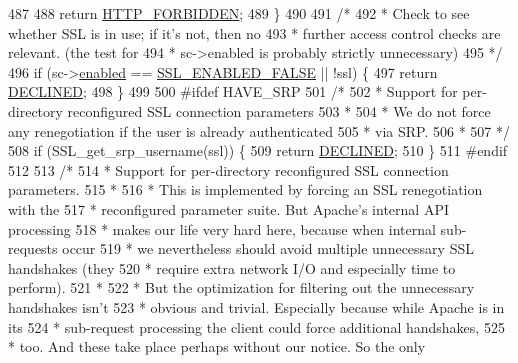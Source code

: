 \begin{DoxyCode}
{487 
488         \textcolor{keywordflow}{return} \hyperlink{group__HTTP__Status_ga92646f876056a1e5013e0050496dc04d}{HTTP\_FORBIDDEN};
489     \}
490 
491     \textcolor{comment}{/*}
492 \textcolor{comment}{     * Check to see whether SSL is in use; if it's not, then no}
493 \textcolor{comment}{     * further access control checks are relevant.  (the test for}
494 \textcolor{comment}{     * sc->enabled is probably strictly unnecessary)}
495 \textcolor{comment}{     */}
496     \textcolor{keywordflow}{if} (sc->\hyperlink{structSSLSrvConfigRec_a79b2e4b68e2efe964c8a0d1e715830f3}{enabled} == \hyperlink{group__MOD__SSL__PRIVATE_gga2a6d65d4ff2b1083702c82c09325c299a68431c402a1002c08844d80b2c5a66b9}{SSL\_ENABLED\_FALSE} || !ssl) \{
497         \textcolor{keywordflow}{return} \hyperlink{group__APACHE__CORE__DAEMON_ga9eba11ca86461a3ae319311d64682dda}{DECLINED};
498     \}
499 
500 \textcolor{preprocessor}{#ifdef HAVE\_SRP}
501     \textcolor{comment}{/*}
502 \textcolor{comment}{     * Support for per-directory reconfigured SSL connection parameters}
503 \textcolor{comment}{     *}
504 \textcolor{comment}{     * We do not force any renegotiation if the user is already authenticated}
505 \textcolor{comment}{     * via SRP.}
506 \textcolor{comment}{     *}
507 \textcolor{comment}{     */}
508     \textcolor{keywordflow}{if} (SSL\_get\_srp\_username(ssl)) \{
509         \textcolor{keywordflow}{return} \hyperlink{group__APACHE__CORE__DAEMON_ga9eba11ca86461a3ae319311d64682dda}{DECLINED};
510     \}
511 \textcolor{preprocessor}{#endif}
512 
513     \textcolor{comment}{/*}
514 \textcolor{comment}{     * Support for per-directory reconfigured SSL connection parameters.}
515 \textcolor{comment}{     *}
516 \textcolor{comment}{     * This is implemented by forcing an SSL renegotiation with the}
517 \textcolor{comment}{     * reconfigured parameter suite. But Apache's internal API processing}
518 \textcolor{comment}{     * makes our life very hard here, because when internal sub-requests occur}
519 \textcolor{comment}{     * we nevertheless should avoid multiple unnecessary SSL handshakes (they}
520 \textcolor{comment}{     * require extra network I/O and especially time to perform).}
521 \textcolor{comment}{     *}
522 \textcolor{comment}{     * But the optimization for filtering out the unnecessary handshakes isn't}
523 \textcolor{comment}{     * obvious and trivial.  Especially because while Apache is in its}
524 \textcolor{comment}{     * sub-request processing the client could force additional handshakes,}
525 \textcolor{comment}{     * too. And these take place perhaps without our notice. So the only}
}
\end{DoxyCode}
